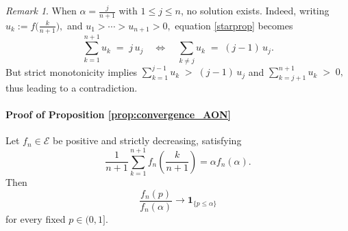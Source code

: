 \documentclass{article}
\theoremstyle{plain}
\theoremstyle{definition}
\theoremstyle{remark}
\newtheorem{remark}[theorem]{Remark}
\begin{document}

\begin{remark} When $\alpha=\tfrac{j}{n+1}$ with $1\le j\le n$, no solution exists. Indeed, writing $u_k:=f\!\Big(\frac{k}{n+1}\Big),$ and $
u_1>\cdots>u_{n+1}>0,$
equation \eqref{starprop} becomes 
\begin{equation}\label{eq:on-grid}
\sum_{k=1}^{n+1} u_k \;=\; j\,u_j
\quad\Longleftrightarrow\quad
\sum_{k\neq j} u_k \;=\; (j-1)\,u_j .
\end{equation}
But strict monotonicity implies $\sum_{k=1}^{j-1} u_k \;>\; (j-1)\,u_j$ and $
\sum_{k=j+1}^{n+1} u_k \;>\; 0, $ thus leading to a contradiction.
\end{remark}
\paragraph{Proof of Proposition \ref{prop:convergence_AON} }

Let \(f_n\in\mathcal E\) be positive and strictly decreasing, satisfying
\[
\frac{1}{n+1}\sum_{k=1}^{n+1}
f_n\!\left(\frac{k}{n+1}\right)
=
\alpha f_n(\alpha).
\tag{\(\star\)}
\]
Then
\[
\frac{f_n(p)}{f_n(\alpha)}
\longrightarrow
\mathbf 1_{\{p\le \alpha\}}
\]
for every fixed \(p\in(0,1]\).
\end{document}
